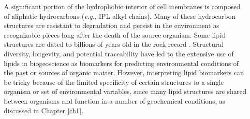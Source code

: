 
A significant portion of the hydrophobic interior of cell membranes is composed of aliphatic hydrocarbons (\textit{e.g.}, IPL alkyl chains). Many of these hydrocarbon structures are resistant to degradation and persist in the environment as recognizable pieces long after the death of the source organism. Some lipid structures are dated to billions of years old in the rock record \citep{brocks2003composition, brocks2003reconstruction}. Structural diversity, longevity, and potential traceability have led to the extensive use of lipids in biogeoscience as biomarkers for predicting environmental conditions of the past or sources of organic matter. However, interpreting lipid biomarkers can be tricky because of the limited specificity of certain structures to a single organism or set of environmental variables, since many lipid structures are shared between organisms and function in a number of geochemical conditions, as discussed in Chapter \ref{ch1}.

